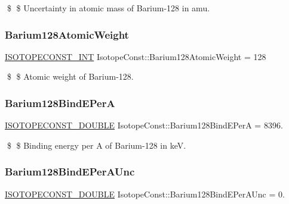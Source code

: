 \$ \$ Uncertainty in atomic mass of Barium-\/128 in amu. \mbox{\label{group___isotope_const-_barium-_ba128_gae72c588166fcca3703092a8509e4f5cd}} 
\subsubsection{\texorpdfstring{Barium128\+Atomic\+Weight}{Barium128AtomicWeight}}
{\footnotesize\ttfamily \mbox{\hyperlink{group___isotope_const-_macros_ga5f18360b3e99483a35c32d789e62621c}{I\+S\+O\+T\+O\+P\+E\+C\+O\+N\+S\+T\+\_\+\+I\+NT}} Isotope\+Const\+::\+Barium128\+Atomic\+Weight = 128}

\$ \$ Atomic weight of Barium-\/128. \mbox{\label{group___isotope_const-_barium-_ba128_gace432bbbd5ab5f9e66ebb42bd20f2a5f}} 
\subsubsection{\texorpdfstring{Barium128\+Bind\+E\+PerA}{Barium128BindEPerA}}
{\footnotesize\ttfamily \mbox{\hyperlink{group___isotope_const-_macros_ga8f45a7272ce02c0b4c65c44636ed719a}{I\+S\+O\+T\+O\+P\+E\+C\+O\+N\+S\+T\+\_\+\+D\+O\+U\+B\+LE}} Isotope\+Const\+::\+Barium128\+Bind\+E\+PerA = 8396.}

\$ \$ Binding energy per A of Barium-\/128 in keV. \mbox{\label{group___isotope_const-_barium-_ba128_gad02fdcb1659f5b532cb2956ea6c904ac}} 
\subsubsection{\texorpdfstring{Barium128\+Bind\+E\+Per\+A\+Unc}{Barium128BindEPerAUnc}}
{\footnotesize\ttfamily \mbox{\hyperlink{group___isotope_const-_macros_ga8f45a7272ce02c0b4c65c44636ed719a}{I\+S\+O\+T\+O\+P\+E\+C\+O\+N\+S\+T\+\_\+\+D\+O\+U\+B\+LE}} Isotope\+Const\+::\+Barium128\+Bind\+E\+Per\+A\+Unc = 0.}

